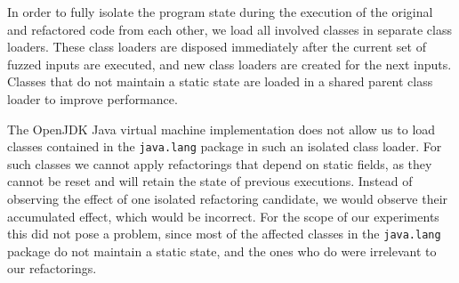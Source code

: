 \documentclass[conference]{IEEEtran}
\begin{document}
In order to fully isolate the program state during the execution of the original and refactored code from each other, we load all involved classes in separate
class loaders. These class loaders are disposed immediately after the current set
of fuzzed inputs are executed, and new class loaders are created for the next
inputs. %
Classes that do not maintain a static state are loaded in a shared
parent class loader to improve performance.

The OpenJDK Java virtual machine implementation does not allow us to load
classes contained in the \lstinline[breaklines=true]{java.lang} package in such an isolated class
loader. For such classes we cannot apply refactorings that depend on static
fields, as they cannot be reset and will retain the state of previous
executions. Instead of observing the effect of one isolated refactoring
candidate, we would observe their accumulated effect, which would be incorrect.
For the scope of our
experiments this did not pose a problem, since most of the affected classes in
the \lstinline[breaklines=true]{java.lang} package do not maintain a static state, and the ones who do
were irrelevant to our refactorings.




\end{document}
